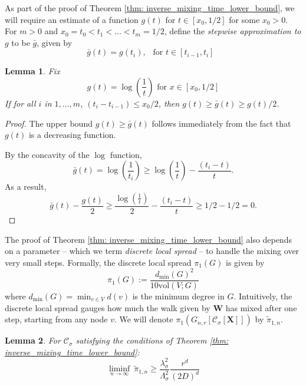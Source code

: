 \documentclass{article}
\newcommand{\vol}{\mathrm{vol}}
\newcommand{\1}{\mathbf{1}}
\newcommand{\Xbf}{\mathbf{X}}
\newcommand{\Wbf}{\mathbf{W}}
\newcommand{\Cset}{\mathcal{C}}
\newcommand{\Csig}{\Cset_{\sigma}}
\theoremstyle{aldenthm}
\newtheorem{lemma}{Lemma}
\begin{document}
As part of the proof of Theorem \ref{thm: inverse_mixing_time_lower_bound}, we will require an estimate of a function $g(t)$ for $t \in [x_0, 1/2]$ for some $x_0 > 0$. For $m > 0$ and $x_0 = t_0 < t_1 < \ldots < t_m = 1/2$, define the \emph{stepwise approximation to $g$} to be $\bar{g}$, given by 
\begin{equation}
\label{eqn: stepwise_approximation}
\bar{g}(t) = g(t_i), ~~ \text{ for $t \in [t_{i-1}, t_i]$ }
\end{equation}
\begin{lemma}
	\label{lem: stepwise_approximation}
	Fix
	\begin{equation*}
	g(t) = \log\left(\frac{1}{t}\right) \text{ for $x \in [x_0, 1/2]$}
	\end{equation*}
	 If for all $i$ in $1,\ldots,m$, $(t_i - t_{i - 1}) \leq x_0/2$, then $g(t) \geq \bar{g}(t)\geq g(t) / 2$.
\end{lemma}
\begin{proof}
	The upper bound $g(t) \geq \bar{g}(t)$ follows immediately from the fact that $g(t)$ is a decreasing function.
	
	By the concavity of the $\log$ function, 
	\begin{equation*}
	\bar{g}(t) = \log\left(\frac{1}{t_i}\right) \geq \log\left(\frac{1}{t}\right) - \frac{(t_i - t)}{t}.
	\end{equation*}
	As a result,
	\begin{equation*}
	\bar{g}(t) - \frac{g(t)}{2} \geq \frac{\log\left(\frac{1}{t}\right)}{2} - \frac{(t_i - t)}{t} \geq 1/2 - 1/2 = 0.
	\end{equation*}
\end{proof}

The proof of Theorem \ref{thm: inverse_mixing_time_lower_bound} also depends on a parameter -- which we term \emph{discrete local spread} -- to handle the mixing over very small steps. Formally, the discrete local spread $\pi_1(G)$ is given by
\begin{equation}
\label{eqn: local_spread}
\pi_1(G) := \frac{d_{\min}(G)^2}{10 \vol(V; G)} 
\end{equation}
where $d_{\min}(G) = \min_{v \in V} d(v)$ is the minimum degree in $G$. Intuitively, the discrete local spread gauges how much the walk given by $\Wbf$ has mixed after one step, starting from any node $v$. We will denote $\pi_1(G_{n,r}[\Csig[\Xbf]])$ by $\widetilde{\pi}_{1,n}$. 

\begin{lemma}
	\label{lem: local_spread_lb}
	For $\Csig$ satisfying the conditions of Theorem \ref{thm: inverse_mixing_time_lower_bound}:
	\begin{equation*}
	\liminf_{n \to \infty}~ \widetilde{\pi}_{1,n} \geq \frac{\lambda_{\sigma}^2}{\Lambda_{\sigma}^2} \frac{r^d}{(2D)^d}
	\end{equation*}
\end{lemma}
\end{document}
